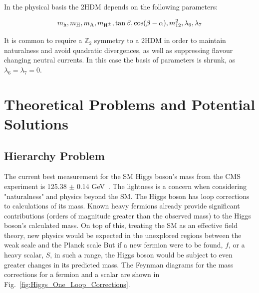 In the physical basis the \ac{2HDM} depends on the following parameters:

\begin{equation}
m_{{\text{h}}}, m_{{\text{H}}}, m_{{\text{A}}}, m_{{\text{H}^{\pm}}}, \tan\beta, \cos(\beta-\alpha), m_{12}^{2}, \lambda_{6}, \lambda_{7}
\end{equation}

It is common to require a $\mathbb{Z}_2$ symmetry to a 2HDM in order to maintain naturalness and avoid quadratic divergences, as well as suppressing flavour changing neutral currents.
In this case the basis of parameters is shrunk, as $\lambda_6 = \lambda_7 = 0$.

\section{Theoretical Problems and Potential Solutions}

\subsection{Hierarchy Problem}

The current best measurement for the \ac{SM} Higgs boson’s mass from the \ac{CMS} experiment is 125.38 $\pm$ 0.14 GeV~\cite{CMS:2020xrn}.
The lightness is a concern when considering "naturalness" and physics beyond the \ac{SM}. 
The Higgs boson has loop corrections to calculations of its mass. 
Known heavy fermions already provide significant contributions (orders of magnitude greater than the observed mass) to the Higgs boson’s calculated mass. 
On top of this, treating the \ac{SM} as an effective field theory, new physics would be expected in the unexplored regions between the weak scale and the Planck scale
But if a new fermion were to be found, $f$, or a heavy scalar, $S$, in such a range, the Higgs boson would be subject to even greater changes in its predicted mass. 
The Feynman diagrams for the mass corrections for a fermion and a scalar are shown in Fig.~\ref{fig:Higgs_One_Loop_Corrections}.


